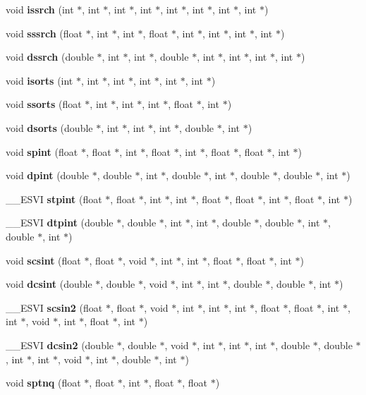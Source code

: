 \begin{CompactItemize}
\item 
void {\bf issrch} (int $\ast$, int $\ast$, int $\ast$, int $\ast$, int $\ast$, int $\ast$, int $\ast$, int $\ast$)
\item 
void {\bf sssrch} (float $\ast$, int $\ast$, int $\ast$, float $\ast$, int $\ast$, int $\ast$, int $\ast$, int $\ast$)
\item 
void {\bf dssrch} (double $\ast$, int $\ast$, int $\ast$, double $\ast$, int $\ast$, int $\ast$, int $\ast$, int $\ast$)
\item 
void {\bf isorts} (int $\ast$, int $\ast$, int $\ast$, int $\ast$, int $\ast$, int $\ast$)
\item 
void {\bf ssorts} (float $\ast$, int $\ast$, int $\ast$, int $\ast$, float $\ast$, int $\ast$)
\item 
void {\bf dsorts} (double $\ast$, int $\ast$, int $\ast$, int $\ast$, double $\ast$, int $\ast$)
\item 
void {\bf spint} (float $\ast$, float $\ast$, int $\ast$, float $\ast$, int $\ast$, float $\ast$, float $\ast$, int $\ast$)
\item 
void {\bf dpint} (double $\ast$, double $\ast$, int $\ast$, double $\ast$, int $\ast$, double $\ast$, double $\ast$, int $\ast$)
\item 
\_\-\_\-ESVI {\bf stpint} (float $\ast$, float $\ast$, int $\ast$, int $\ast$, float $\ast$, float $\ast$, int $\ast$, float $\ast$, int $\ast$)
\item 
\_\-\_\-ESVI {\bf dtpint} (double $\ast$, double $\ast$, int $\ast$, int $\ast$, double $\ast$, double $\ast$, int $\ast$, double $\ast$, int $\ast$)
\item 
void {\bf scsint} (float $\ast$, float $\ast$, void $\ast$, int $\ast$, int $\ast$, float $\ast$, float $\ast$, int $\ast$)
\item 
void {\bf dcsint} (double $\ast$, double $\ast$, void $\ast$, int $\ast$, int $\ast$, double $\ast$, double $\ast$, int $\ast$)
\item 
\_\-\_\-ESVI {\bf scsin2} (float $\ast$, float $\ast$, void $\ast$, int $\ast$, int $\ast$, int $\ast$, float $\ast$, float $\ast$, int $\ast$, int $\ast$, void $\ast$, int $\ast$, float $\ast$, int $\ast$)
\item 
\_\-\_\-ESVI {\bf dcsin2} (double $\ast$, double $\ast$, void $\ast$, int $\ast$, int $\ast$, int $\ast$, double $\ast$, double $\ast$, int $\ast$, int $\ast$, void $\ast$, int $\ast$, double $\ast$, int $\ast$)
\item 
void {\bf sptnq} (float $\ast$, float $\ast$, int $\ast$, float $\ast$, float $\ast$)

\end{CompactItemize}
